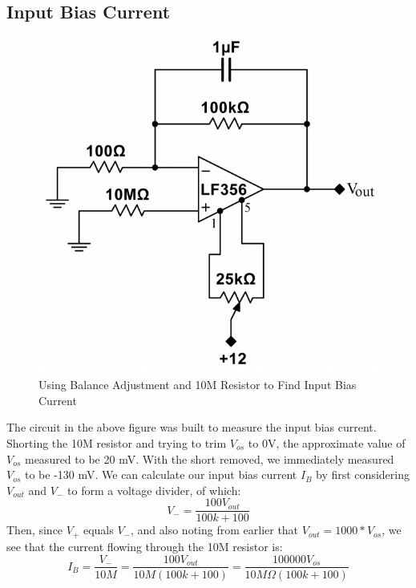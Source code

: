 \documentclass{article}
\begin{document}
\subsection{Input Bias Current}
    \begin{figure}[H]
        \centering
        \includegraphics[scale = 0.5]{3.png}
        \caption{Using Balance Adjustment and 10M Resistor to Find Input Bias Current \cite{lab8}}
        \label{fig:my_label}
    \end{figure}
    The circuit in the above figure was built to measure the input bias current. Shorting the 10M resistor and trying to trim $V_{os}$ to 0V, the approximate value of $V_{os}$ measured to be 20 mV. With the short removed, we immediately measured $V_{os}$ to be -130 mV. We can calculate our input bias current $I_B$ by first considering $V_{out}$ and $V_-$ to form a voltage divider, of which:
    \begin{equation}
        V_- = \frac{100 V_{out}}{100k + 100}
    \end{equation}
    Then, since $V_+$ equals $V_-$, and also noting from earlier that $V_{out} = 1000*V_{os}$, we see that the current flowing through the 10M resistor is:
    \begin{equation}
        I_B = \frac{V_-}{10M} = \frac{100 V_{out}}{10M(100k + 100)} = \frac{100000 V_{os}}{10M\Omega(100k + 100)}
    \end{equation}
\end{document}
